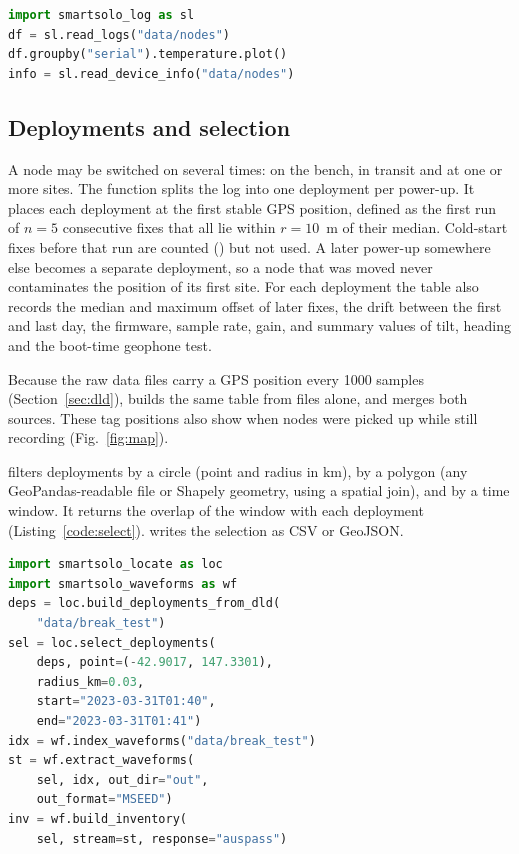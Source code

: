 \documentclass[report]{seismica}
\begin{document}
\begin{lstlisting}[caption=Reading logs and plotting state of health., label=code:log, language=Python]
import smartsolo_log as sl
df = sl.read_logs("data/nodes")
df.groupby("serial").temperature.plot()
info = sl.read_device_info("data/nodes")
\end{lstlisting}

\subsection{Deployments and selection}

A node may be switched on several times: on the bench, in transit and at one or more sites. The function  splits the log into one deployment per power-up. It places each deployment at the first stable GPS position, defined as the first run of $n=5$ consecutive fixes that all lie within $r=10$~m of their median. Cold-start fixes before that run are counted () but not used. A later power-up somewhere else becomes a separate deployment, so a node that was moved never contaminates the position of its first site. For each deployment the table also records the median and maximum offset of later fixes, the drift between the first and last day, the firmware, sample rate, gain, and summary values of tilt, heading and the boot-time geophone test.

Because the raw data files carry a GPS position every 1000 samples (Section~\ref{sec:dld}),  builds the same table from  files alone, and  merges both sources. These tag positions also show when nodes were picked up while still recording (Fig.~\ref{fig:map}).

 filters deployments by a circle (point and radius in km), by a polygon (any GeoPandas-readable file or Shapely geometry, using a spatial join), and by a time window. It returns the overlap of the window with each deployment (Listing~\ref{code:select}).  writes the selection as CSV or GeoJSON.

\begin{lstlisting}[caption=Selecting and cutting waveforms., label=code:select, language=Python]
import smartsolo_locate as loc
import smartsolo_waveforms as wf
deps = loc.build_deployments_from_dld(
    "data/break_test")
sel = loc.select_deployments(
    deps, point=(-42.9017, 147.3301),
    radius_km=0.03,
    start="2023-03-31T01:40",
    end="2023-03-31T01:41")
idx = wf.index_waveforms("data/break_test")
st = wf.extract_waveforms(
    sel, idx, out_dir="out",
    out_format="MSEED")
inv = wf.build_inventory(
    sel, stream=st, response="auspass")
\end{lstlisting}
\end{document}
